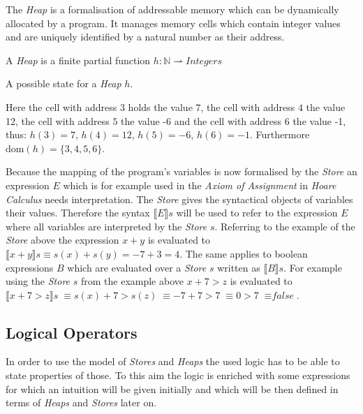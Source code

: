 	The \emph{Heap} is a formalisation of addressable memory which can be
	dynamically allocated by a program. It manages memory cells which contain
	integer values and are uniquely identified by a natural number as their
	address.
	\begin{mydef}
		A \emph{Heap} is a finite partial function
		$h:\mathbb{N} \rightharpoonup \textit{Integers}$
	\end{mydef}
	\begin{myexp}
	A possible state for a \emph{Heap} $h$.\\
	\begin{center}
	\end{center}
	\label{fig:heap}
	 Here the cell with address
	$3$ holds the value $7$, the cell with address $4$ the value 12,
	the cell with address $5$ the value -6 and the cell with address $6$ the
	value -1,
	thus: $h(3) = 7$, $h(4) = 12$, $h(5) = -6$, $h(6)=-1$.
	Furthermore $\text{dom}(h) = \{3,4,5,6\}$.
	\end{myexp}

	Because the mapping of the program's variables is now formalised by the
	\emph{Store} an expression $E$ which is for example used in the
	\emph{Axiom of Assignment} in \emph{Hoare Calculus} needs interpretation.
	The \emph{Store} gives the syntactical objects of variables their values. Therefore
	the syntax $\llbracket E \rrbracket s$ will be used to refer to the expression
	$E$ where all variables are interpreted by the \emph{Store} $s$. Referring to
	the example of the \emph{Store} above the expression $x + y$ is evaluated to
	$\llbracket x + y \rrbracket s \equiv s(x) + s(y) = -7 + 3 = 4$. The same
	applies to boolean expressions $B$ which are evaluated over a \emph{Store}
	$s$ written as $\llbracket B \rrbracket s$. For example using the \emph{Store}
	$s$ from the example above $x + 7 > z$ is evaluated to
	${\llbracket x + 7 > z \rrbracket s} {\;\equiv s(x) + 7 > s(z)}
	 {\;\equiv -7 + 7 > 7} {\;\equiv  0 > 7} {\;\equiv \textit{false}}$.

	\subsection{Logical Operators}
	In order to use the model of \emph{Stores} and \emph{Heaps} the used logic
	has to be able to state properties of those.
	To this aim the logic is enriched with some expressions for which an intuition
	will be given initially and which will be then defined in terms of
	\emph{Heaps} and \emph{Stores} later on.

